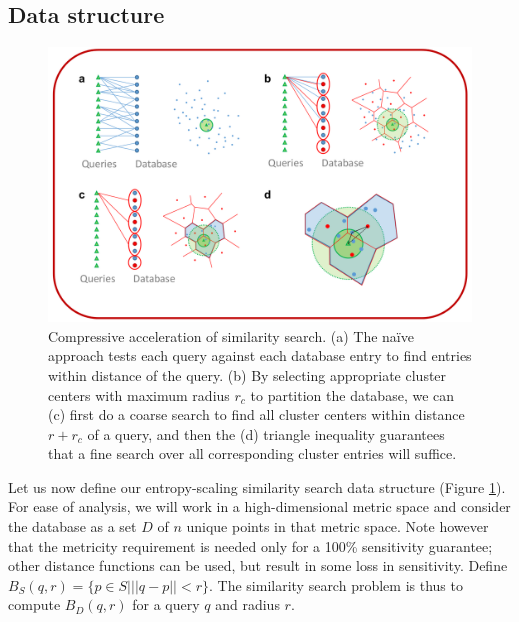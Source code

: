 \documentclass{amsbook}
\theoremstyle{definition}
\theoremstyle{remark}
\numberwithin{equation}{section}
\begin{document}
\subsection{Data structure}
\begin{figure}[btp]
    \centering
    \includegraphics[width=1\textwidth]{assets/dataStructure}
    \caption{ Compressive acceleration of similarity search. %
            (a) The na\"ive approach tests each query against each database entry to find entries within distance  of the query. %
            (b) By selecting appropriate cluster centers with maximum radius $r_c$ to partition the database, we can (c) first do a coarse search to find all cluster centers within distance $r+r_c$ of a query, and then the (d) triangle inequality guarantees that a fine search over all corresponding cluster entries will suffice.}
    \label{fig:dataStructure}
\end{figure}

Let us now define our entropy-scaling similarity search data structure (Figure \ref{fig:dataStructure}).
For ease of analysis, we will work in a high-dimensional metric space and consider the database as a set $D$ of $n$ unique points in that metric space.
Note however that the metricity requirement is needed only for a 100\% sensitivity guarantee; other distance functions can be used, but result in some loss in sensitivity.
Define $B_S(q,r) = \{ p \in S | ||q-p||<r \}$. The similarity search problem is thus to compute $B_D(q,r)$ for a query $q$ and radius $r$.
\end{document}
